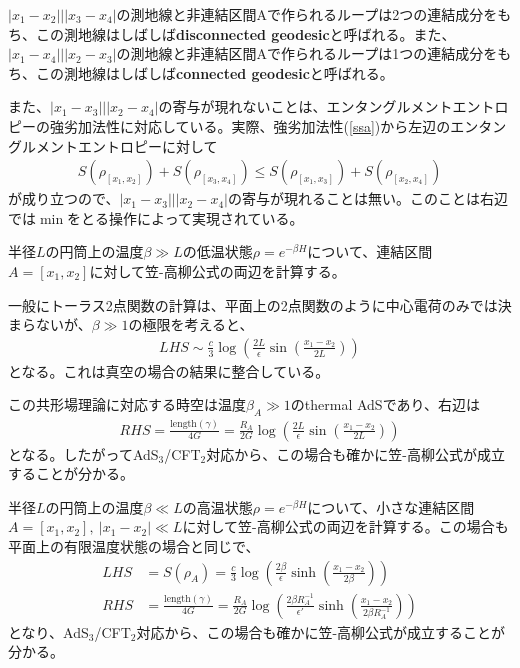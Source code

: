 $|x_1-x_2|||x_3-x_4|$の測地線と非連結区間Aで作られるループは2つの連結成分をもち、この測地線はしばしば\textbf{disconnected geodesic}と呼ばれる。また、$|x_1-x_4|||x_2-x_3|$の測地線と非連結区間Aで作られるループは1つの連結成分をもち、この測地線はしばしば\textbf{connected geodesic}と呼ばれる。

また、$|x_1-x_3|||x_2-x_4|$の寄与が現れないことは、エンタングルメントエントロピーの強劣加法性に対応している。実際、強劣加法性(\ref{ssa})から左辺のエンタングルメントエントロピーに対して
\begin{align}
S(\rho_{[x_1,x_2]})+S(\rho_{[x_3,x_4]})\le S(\rho_{[x_1,x_3]})+S(\rho_{[x_2,x_4]})
\end{align}
が成り立つので、$|x_1-x_3|||x_2-x_4|$の寄与が現れることは無い。このことは右辺では$\min$をとる操作によって実現されている。

半径$L$の円筒上の温度$\beta\gg L$の低温状態$\rho=e^{-\beta H}$について、連結区間$A=[x_1,x_2]$に対して笠-高柳公式の両辺を計算する。

一般にトーラス2点関数の計算は、平面上の2点関数のように中心電荷のみでは決まらないが、$\beta\gg 1$の極限を考えると、
\begin{align}
LHS\sim \frac{c}{3}\log \left(\frac{2L}{\epsilon}\sin\left(\frac{x_1-x_2}{2L}\right)\right)
\end{align}
となる。これは真空の場合の結果に整合している。

この共形場理論に対応する時空は温度$\beta_A\gg 1$のthermal AdSであり、右辺は
\begin{align}
RHS=\frac{\text{length}(\gamma)}{4G}=\frac{R_A}{2G}\log \left(\frac{2L}{\epsilon}\sin\left(\frac{x_1-x_2}{2L}\right)\right)
\end{align}
となる。したがってAdS$_3$/CFT$_2$対応から、この場合も確かに笠-高柳公式が成立することが分かる。

半径$L$の円筒上の温度$\beta\ll L$の高温状態$\rho=e^{-\beta H}$について、小さな連結区間$A=[x_1,x_2],\ |x_1-x_2|\ll L$に対して笠-高柳公式の両辺を計算する。この場合も平面上の有限温度状態の場合と同じで、
\begin{align}
LHS&=S(\rho_A)=\frac{c}{3}\log\left(\frac{2\beta}{\epsilon}\sinh\left(\frac{x_1-x_2}{2\beta}\right)\right)\\
RHS&=\frac{\text{length}(\gamma)}{4G}=\frac{R_A}{2G}\log \left(\frac{2\beta R_A^{-1}}{\epsilon'}\sinh\left(\frac{x_1-x_2}{2\beta R_A^{-1}}\right)\right)
\end{align}
となり、AdS$_3$/CFT$_2$対応から、この場合も確かに笠-高柳公式が成立することが分かる。

